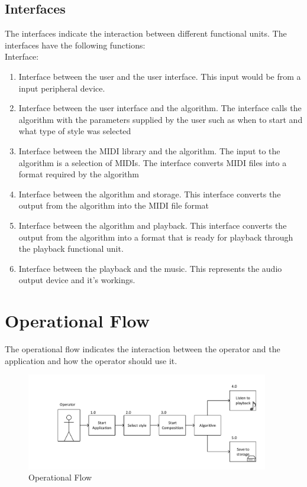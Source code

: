 \section{Interfaces}
The interfaces indicate the interaction between different functional units.
The interfaces have the following functions:
\\Interface:
\begin{enumerate}
\item Interface between the user and the user interface. This input would be from a input peripheral device.
\item Interface between the user interface and the algorithm. The interface calls the algorithm with the parameters supplied by the user such as when to start and what type of style was selected
\item Interface between the \ac{MIDI} library and the algorithm. The input to the algorithm is a selection of \acp{MIDI}. The interface converts \ac{MIDI} files into a format required by the algorithm
\item Interface between the algorithm and storage. This interface converts the output from the algorithm into the \ac{MIDI} file format
\item Interface between the algorithm and playback. This interface converts the output from the algorithm into a format that is ready for playback through the playback functional unit.
\item Interface between the playback and the music. This represents the audio output device and it's workings.
\end{enumerate}

\chapter{Operational Flow}

The operational flow indicates the interaction between the operator and the application and how the operator should use it.

\begin{figure}[ht]
\centerline{\includegraphics[width=400px]{../images/operational_flow.pdf}}
\caption{Operational Flow}
\label{ims:oppflow}
\end{figure}


